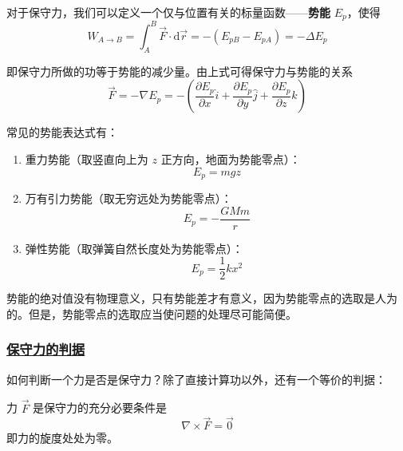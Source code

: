 对于保守力，我们可以定义一个仅与位置有关的标量函数——\textbf{势能} $E_p$，使得
\begin{equation}
    W_{A \to B} = \int_{A}^{B} \vec{F} \cdot \mathrm{d}\vec{r} = -(E_{pB} - E_{pA}) = -\Delta E_p
\end{equation}

即保守力所做的功等于势能的减少量。由上式可得保守力与势能的关系
\begin{equation}
    \vec{F} = -\nabla E_p = -\left(\frac{\partial E_p}{\partial x}\hat{i} + \frac{\partial E_p}{\partial y}\hat{j} + \frac{\partial E_p}{\partial z}\hat{k}\right)
\end{equation}

常见的势能表达式有：
\begin{enumerate}
    \item 重力势能（取竖直向上为 $z$ 正方向，地面为势能零点）：
    \begin{equation}
        E_p = mgz
    \end{equation}
    \item 万有引力势能（取无穷远处为势能零点）：
    \begin{equation}
        E_p = -\frac{GMm}{r}
    \end{equation}
    \item 弹性势能（取弹簧自然长度处为势能零点）：
    \begin{equation}
        E_p = \frac{1}{2}kx^2
    \end{equation}
\end{enumerate}

\begin{remark}
    势能的绝对值没有物理意义，只有势能差才有意义，因为势能零点的选取是人为的。但是，势能零点的选取应当使问题的处理尽可能简便。
\end{remark}

\subsubsection{\protect\hyperlink{:}{保守力的判据}}

如何判断一个力是否是保守力？除了直接计算功以外，还有一个等价的判据：

\begin{theorem}[保守力的旋度判据]
    力 $\vec{F}$ 是保守力的充分必要条件是
    \begin{equation}
        \nabla \times \vec{F} = \vec{0}
    \end{equation}
    即力的旋度处处为零。
\end{theorem}

